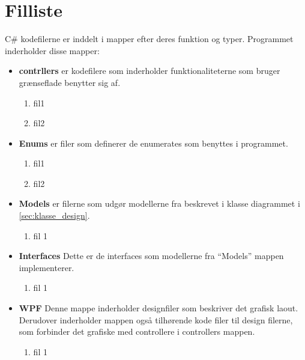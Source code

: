 \chapter{Filliste}
\label{cha:filliste}

C\# kodefilerne er inddelt i mapper efter deres funktion og typer.
Programmet inderholder disse mapper:

\begin{itemize}
	\item \textbf{contrllers} er kodefilere som inderholder funktionaliteterne som bruger grænseflade benytter sig af. 
		\begin{enumerate}
			\item fil1
			\item fil2
		\end{enumerate}	
\end{itemize}


\begin{itemize}
	\item \textbf{Enums} er filer som definerer de enumerates som benyttes i programmet.
		\begin{enumerate}
			\item fil1
			\item fil2
		\end{enumerate}
\end{itemize}

\begin{itemize}
	\item \textbf{Models} er filerne som udgør modellerne fra beskrevet i klasse diagrammet i \cref{sec:klasse_design}.
		\begin{enumerate}
			\item fil 1 
		\end{enumerate}
\end{itemize}


\begin{itemize}
	\item \textbf{Interfaces} Dette er de interfaces som modellerne fra \enquote{Models} mappen implementerer.
		\begin{enumerate}
			\item fil 1
		\end{enumerate}
\end{itemize}

\begin{itemize}
	\item \textbf{WPF} Denne mappe inderholder designfiler som beskriver det grafisk laout. Derudover inderholder mappen også tilhørende kode filer til design filerne, som forbinder det grafiske med controllere i controllers mappen.
		\begin{enumerate}
			\item fil 1
		\end{enumerate}
\end{itemize}
